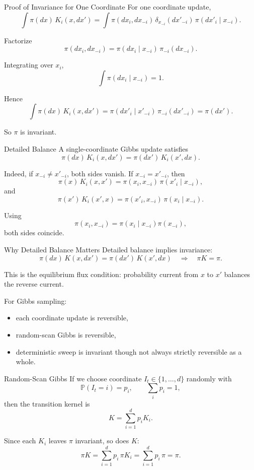 \documentclass[aspectratio=169]{beamer}
\begin{document}
\begin{frame}{Proof of Invariance for One Coordinate}
For one coordinate update,
\[
\int \pi(dx)\,K_i(x,dx')
=
\int \pi(dx_i,dx_{-i})\,\delta_{x_{-i}}(dx'_{-i})\,\pi(dx'_i\mid x_{-i}).
\]

Factorize
\[
\pi(dx_i,dx_{-i})=\pi(dx_i\mid x_{-i})\,\pi_{-i}(dx_{-i}).
\]

Integrating over \(x_i\),
\[
\int \pi(dx_i\mid x_{-i})=1.
\]

Hence
\[
\int \pi(dx)\,K_i(x,dx')
=
\pi(dx'_i\mid x'_{-i})\,\pi_{-i}(dx'_{-i})
=
\pi(dx').
\]

So \(\pi\) is invariant.
\end{frame}

\begin{frame}{Detailed Balance}
A single-coordinate Gibbs update satisfies
\[
\pi(dx)\,K_i(x,dx')=\pi(dx')\,K_i(x',dx).
\]

Indeed, if \(x_{-i}\neq x'_{-i}\), both sides vanish. If \(x_{-i}=x'_{-i}\), then
\[
\pi(x)\,K_i(x,x')
=
\pi(x_i,x_{-i})\,\pi(x'_i\mid x_{-i}),
\]
and
\[
\pi(x')\,K_i(x',x)
=
\pi(x'_i,x_{-i})\,\pi(x_i\mid x_{-i}).
\]

Using
\[
\pi(x_i,x_{-i})=\pi(x_i\mid x_{-i})\pi(x_{-i}),
\]
both sides coincide.
\end{frame}

\begin{frame}{Why Detailed Balance Matters}
Detailed balance implies invariance:
\[
\pi(dx)\,K(x,dx')=\pi(dx')\,K(x',dx)
\quad\Longrightarrow\quad
\pi K=\pi.
\]

This is the equilibrium flux condition: probability current from \(x\) to \(x'\) balances the reverse current.

For Gibbs sampling:
\begin{itemize}
    \item each coordinate update is reversible,
    \item random-scan Gibbs is reversible,
    \item deterministic sweep is invariant though not always strictly reversible as a whole.
\end{itemize}
\end{frame}

\begin{frame}{Random-Scan Gibbs}
If we choose coordinate \(I_t\in\{1,\dots,d\}\) randomly with
\[
\mathbb{P}(I_t=i)=p_i,\qquad \sum_i p_i=1,
\]
then the transition kernel is
\[
K=\sum_{i=1}^d p_i K_i.
\]

Since each \(K_i\) leaves \(\pi\) invariant, so does \(K\):
\[
\pi K=\sum_{i=1}^d p_i\,\pi K_i=\sum_{i=1}^d p_i\,\pi=\pi.
\]
\end{frame}
\end{document}
